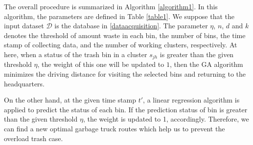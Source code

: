 \documentclass[conference,compsoc]{IEEEtran}
\begin{document}
\par  The overall procedure is summarized in Algorithm \ref{algorithm1}. In this algorithm, the parameters are defined in Table \ref{table1}. We suppose that the input dataset $\mathcal{D}$ is the database in \ref{dataacquisition}. The parameter $\eta$, $n$, $d$ and $k$ denotes the threshold of amount waste in each bin, the number of bins, the time stamp of collecting data, and the number of working clusters, respectively.
At here, when a status of the trash bin in a cluster $s_{jh}$ is greater than the given threshold $\eta$, the weight of this one will be updated to $1$, then the GA algorithm minimizes the driving distance for visiting the selected bins and returning to the headquarters. 
\par On the other hand, at the given time stamp $t'$, a linear regression algorithm is applied to predict the status of each bin. If the prediction status of bin is greater than the given threshold $\eta$, the weight is updated to 1, accordingly. Therefore, we can find a new optimal garbage truck routes which help us to prevent the overload trash case.
\end{document}
